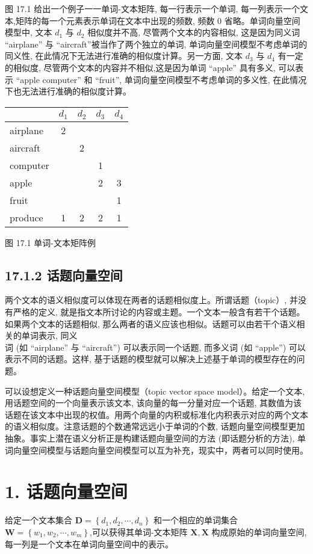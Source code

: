 \documentclass[10pt]{article}
\begin{document}
图 17.1 给出一个例子一一单词-文本矩阵, 每一行表示一个单词, 每一列表示一个文本,矩阵的每一个元素表示单词在文本中出现的频数, 频数 0 省略。单词向量空间模型中, 文本 $d_{1}$ 与 $d_{2}$ 相似度并不高, 尽管两个文本的内容相似, 这是因为同义词 “airplane” 与 “aircraft”被当作了两个独立的单词, 单词向量空间模型不考虑单词的同义性, 在此情况下无法进行准确的相似度计算。另一方面, 文本 $d_{3}$ 与 $d_{4}$ 有一定的相似度, 尽管两个文本的内容并不相似,这是因为单词 “apple” 具有多义, 可以表示 “apple computer” 和 “fruit”, 单词向量空间模型不考虑单词的多义性, 在此情况下也无法进行准确的相似度计算。

\begin{center}
\begin{tabular}{|l|cccc|}
\hline
 & $d_{1}$ & $d_{2}$ & $d_{3}$ & $d_{4}$ \\
\hline
airplane & 2 &  &  &  \\
aircraft &  & 2 &  &  \\
computer &  &  & 1 &  \\
apple &  &  & 2 & 3 \\
fruit &  &  &  & 1 \\
produce & 1 & 2 & 2 & 1 \\
\hline
\end{tabular}
\end{center}

图 17.1 单词-文本矩阵例

\subsection*{17.1.2 话题向量空间}
两个文本的语义相似度可以体现在两者的话题相似度上。所谓话题（topic）, 并没有严格的定义, 就是指文本所讨论的内容或主题。一个文本一般含有若干个话题。如果两个文本的话题相似, 那么两者的语义应该也相似。话题可以由若干个语义相关的单词表示, 同义\\
词 (如 “airplane” 与 “aircraft”) 可以表示同一个话题, 而多义词 (如 “apple”) 可以表示不同的话题。这样, 基于话题的模型就可以解决上述基于单词的模型存在的问题。

可以设想定义一种话题向量空间模型（topic vector space model）。给定一个文本, 用话题空间的一个向量表示该文本, 该向量的每一分量对应一个话题, 其数值为该话题在该文本中出现的权值。用两个向量的内积或标准化内积表示对应的两个文本的语义相似度。注意话题的个数通常远远小于单词的个数, 话题向量空间模型更加抽象。事实上潜在语义分析正是构建话题向量空间的方法 (即话题分析的方法), 单词向量空间模型与话题向量空间模型可以互为补充，现实中，两者可以同时使用。

\section*{1. 话题向量空间}
给定一个文本集合 $\boldsymbol{D}=\left\{d_{1}, d_{2}, \cdots, d_{n}\right\}$ 和一个相应的单词集合 $\boldsymbol{W}=\left\{w_{1}, w_{2}, \cdots, w_{m}\right\}$,可以获得其单词-文本矩阵 $\boldsymbol{X}, \boldsymbol{X}$ 构成原始的单词向量空间, 每一列是一个文本在单词向量空间中的表示。
\end{document}
